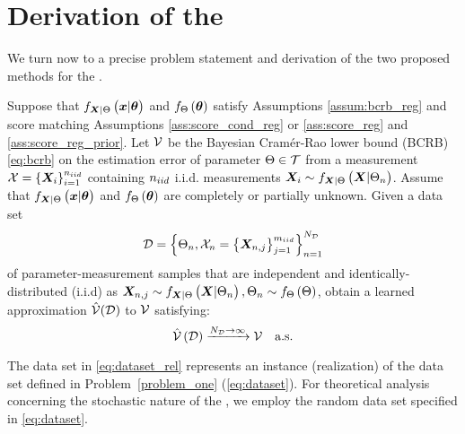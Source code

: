 \section{{Derivation of the \name{}}}\label{sec:lbcrb}
{We turn now to a precise problem statement and derivation of the two proposed methods for the \name{}.}
\begin{tcolorbox}
\begin{problem}\label{problem_one}
 Suppose that $\probt{\x|\p}{\X|\pr}$ and $f_{\Theta}\left(\bm{\theta}\right)$ satisfy Assumptions \ref{assum:bcrb_reg} and %
 score matching Assumptions \ref{ass:score_cond_reg} or \ref{ass:score_reg} and \ref{ass:score_reg_prior}. 
 {Let $\mathcal{V}$ be the}  %
Bayesian Cram\'er-Rao lower bound (BCRB) \eqref{eq:bcrb} on the estimation error of parameter $\Theta\in\mathcal{T}$ from a %
measurement {$\xset = \set{{\X}_{i}}_{i=1}^{\niideval}$ containing $n_{iid}$ i.i.d. measurements ${\X}_i \sim  \probt{\X|\pr_n}{\X|\pr}$.}
{Assume that $\probt{\x|\p}{\X|\pr}$ and $f_{\Theta}\left(\bm{\theta}\right)$ are completely or partially unknown.}
Given a data set 
        {\begin{equation}\label{eq:dataset}
          \ds=\set{\pr_n, \mathcal{\X}_n=\set{{\X}_{n,j}}_{j=1}^{\niiddata}   }_{n=1}^{\nds} 
        \end{equation}}
\noindent 
of  {parameter-measurement} samples that are independent and identically-distributed (i.i.d) 
as    %
{${\X}_{n,j} \sim  \probt{\X|\pr_n}{\X|\pr}, \pr_n\sim \probt{\pr}{\pr}$, }
obtain {a learned approximation  \name{} $\hat{\mathcal{V}}(\mathcal{D})$ to  $\mathcal{V}$} satisfying:
\begin{equation}
     {\hat{\bcrb}}\brackets{\ds}
     \xrightarrow{\nds \rightarrow \infty}\bcrb\quad\text{%
     {a.s}}.
\end{equation}

\end{problem}
\end{tcolorbox}
\begin{remark}
    The data set in \eqref{eq:dataset_rel} represents an instance {(realization)} of the data set defined in Problem~\ref{problem_one} (\eqref{eq:dataset}). For theoretical analysis concerning the stochastic nature of the \name{}, we employ the random data set specified in \eqref{eq:dataset}.
\end{remark}

